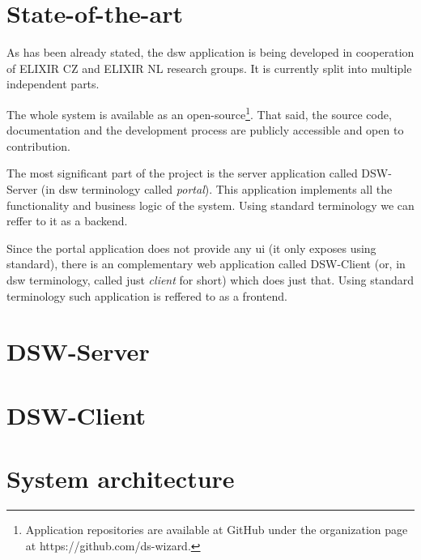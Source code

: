 \section{State-of-the-art}

As has been already stated, the \gls{dsw} application is being developed in cooperation of ELIXIR CZ and ELIXIR NL research groups.
It is currently split into multiple independent parts.

The whole system is available as an open-source\footnote{Application repositories are available at GitHub under the organization page at https://github.com/ds-wizard.}.
That said, the source code, documentation and the development process are publicly accessible and open to contribution.

The most significant part of the project is the server application called DSW-Server (in \gls{dsw} terminology called \textit{portal}).
This application implements all the functionality and business logic of the system.
Using standard terminology we can reffer to it as a backend.

Since the portal application does not provide any \gls{ui} (it only exposes  using  standard), there is an complementary web application called DSW-Client (or, in \gls{dsw} terminology, called just \textit{client} for short) which does just that.
Using standard terminology such application is reffered to as a frontend.


\section{DSW-Server}

\section{DSW-Client}

\section{System architecture}
